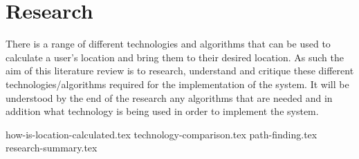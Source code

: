 \section{Research}
There is a range of different technologies and algorithms that can be used to calculate a user’s location and bring them to their desired location. As such the aim of this literature review is to research, understand and critique these different technologies/algorithms required for the implementation of the system. It will be understood by the end of the research any algorithms that are needed and in addition what technology is being used in order to implement the system.
		
{how-is-location-calculated.tex}
{technology-comparison.tex}
{path-finding.tex}
{research-summary.tex}
